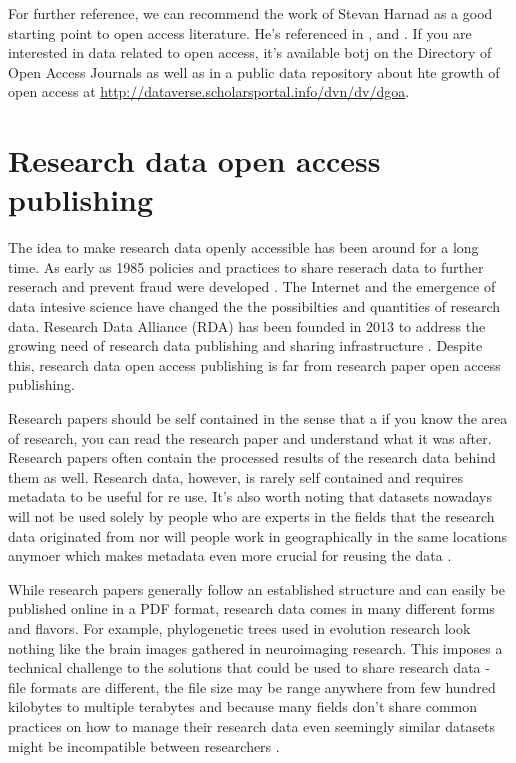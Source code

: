 For further reference, we can recommend the work of Stevan Harnad as a good
starting point to open access literature. He's referenced in
\cite{DBLP:journals/corr/abs-cs-0606079}, \cite{harnad2004comparing} and
\cite{harnad2004access}. If you are interested in data related to open access,
it's available botj on the Directory of Open Access Journals as well as in a
public data repository about hte growth of open access at
\url{http://dataverse.scholarsportal.info/dvn/dv/dgoa}.

\section{Research data open access publishing}
\label{sec:research_data_oa}

The idea to make research data openly accessible has been around for a long
time. As early as 1985 policies and practices to share reserach data to further
reserach and prevent fraud were developed \cite{fienberg1985sharing}.
The Internet and the emergence of data intesive science have changed the the
possibilties and quantities of research data. Research Data Alliance (RDA)
has been founded in 2013 to address the growing need of research data
publishing and sharing infrastructure \cite{DBLP:journals/dlib/BermanWW14}
\cite{DBLP:books/ms/4paradigm09}. Despite this, research data open access
publishing is far from research paper open access publishing.

Research papers should be self contained in the sense that a if you know the
area of research, you can read the research paper and understand what it was
after. Research papers often contain the processed results of the research data
behind them as well. Research data, however, is rarely self contained and
requires metadata to be useful for re use. It's also worth noting that datasets
nowadays will not be used solely by people who are experts in the fields that
the research data originated from nor will people work in geographically in the
same locations anymoer which makes metadata even more crucial for reusing the
data \cite{DBLP:journals/jbi/HarrisTTPGC09} \cite{DBLP:journals/jasis/Borgman12}.

While research papers generally follow an established structure and can easily
be published online in a PDF format, research data comes in many different
forms and flavors. For example, phylogenetic trees used in evolution
research look nothing like the brain images gathered in neuroimaging
research. This imposes a technical challenge to the solutions that
could be used to share research data - file formats are different, the
file size may be range anywhere from few hundred kilobytes to multiple
terabytes and because many fields don't share common practices on how to
manage their research data even seemingly similar datasets might be
incompatible between researchers \cite{whitlock2011data}
\cite{DBLP:journals/fini/PolineBGGHHHHKMPSAK12}.

